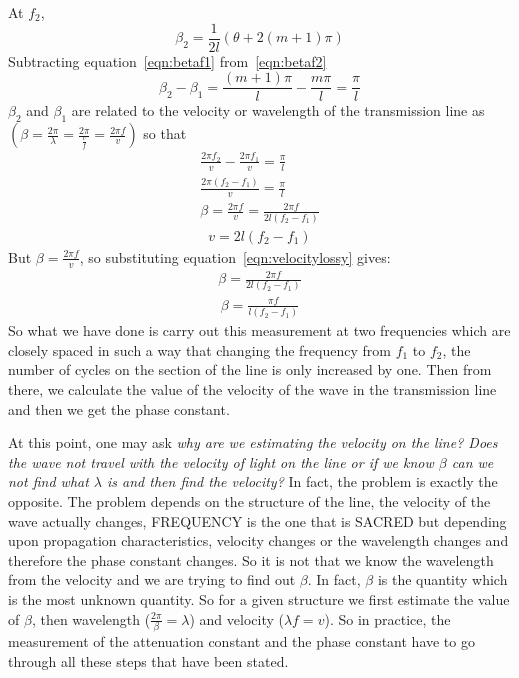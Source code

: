 At $f_2$,
\begin{equation}
\beta_2 = \frac{1}{2l}(\theta + 2(m + 1)\pi)
\label{eqn:betaf2}
\end{equation}
Subtracting equation~\eqref{eqn:betaf1} from~\eqref{eqn:betaf2}
\begin{dmath*}
\beta_2 - \beta_1 = \frac{(m + 1)\pi}{l} - \frac{m\pi}{l}
= \frac{\pi}{l}
\end{dmath*}
$\beta_2$ and $\beta_1$ are related to the velocity or wavelength of the transmission line as $( \beta = \frac{2\pi}{\lambda} = \frac{2\pi}{\frac{v}{f}} = \frac{2\pi f}{v})$ so that
\begin{align*}
\frac{2\pi f_2}{v} - \frac{2\pi f_1}{v} = \frac{\pi}{l}\\
\frac{2\pi(f_2 - f_1)}{v} = \frac{\pi}{l}\\
\beta = \frac{2\pi f}{v} = \frac{2\pi f}{2l(f_2 - f_1)}
\end{align*}
\begin{align}
v = 2l(f_2-f_1)
\label{eqn:velocitylossy}
\end{align}
But $\beta = \frac{2\pi f}{v}$, so substituting equation~\eqref{eqn:velocitylossy} gives:
\begin{align*}
\beta = \frac{2\pi f}{2l(f_2 - f_1)}
\end{align*}
\begin{align}
\beta = \frac{\pi f}{l(f_2 - f_1)}
\end{align}
So what we have done is carry out this measurement at two frequencies which are closely spaced in such a way that changing the frequency from $f_1$ to $f_2$, the number of cycles on the section of the line is only increased by one. Then from there, we calculate the value of the velocity of the wave in the transmission line and then we get the phase constant.

At this point, one may ask \emph{why are we estimating the velocity on the line? Does the wave not travel with the velocity of light on the line or if we know $\beta$ can we not find what $\lambda$ is and then find the velocity?} In fact, the problem is exactly the opposite. The problem depends on the structure of the line, the velocity of the wave actually changes, FREQUENCY is the one that is SACRED but depending upon propagation characteristics, velocity changes or the wavelength changes and therefore the phase constant changes. So it is not that we know the wavelength from the velocity and we are trying to find out $\beta$. In fact, $\beta$ is the quantity which is the most unknown quantity. So for a given structure we first estimate the value of $\beta$, then wavelength ($\frac{2\pi}{\beta}= \lambda$) and velocity ($\lambda f = v$). So in practice, the measurement of the attenuation constant and the phase constant have to go through all these steps that have been stated.

